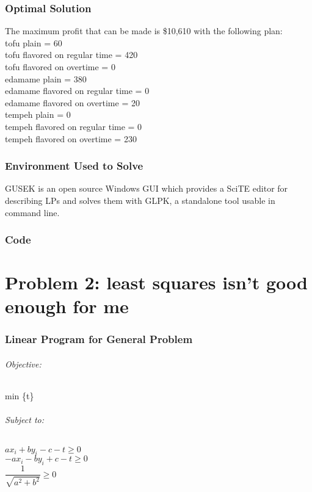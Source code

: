 \documentclass{article}
\begin{document}
\section*{Optimal Solution}
The maximum profit that can be made is \$10,610 with the following plan:\\
tofu plain = 60\\
tofu flavored on regular time = 420\\
tofu flavored on overtime = 0\\
edamame plain = 380\\
edamame flavored on regular time = 0\\
edamame flavored on overtime = 20\\
tempeh plain = 0\\
tempeh flavored on regular time = 0\\
tempeh flavored on overtime = 230\\

\section*{Environment Used to Solve}
GUSEK is an open source Windows GUI which provides a SciTE editor for describing LPs and solves them with GLPK, a standalone tool usable in command line.

\section*{Code}


\pagebreak


\part*{Problem 2: least squares isn't good enough for me}
\section*{Linear Program for General Problem}
\paragraph*{Objective:}
min \{t\}

\paragraph*{Subject to:\\}
$ax_i + by_i - c - t \geq 0$\\
$-ax_i - by_i + c - t \geq 0$\\
$\dfrac{1} {\sqrt{a^2 + b^2}} \geq 0$
\end{document}
